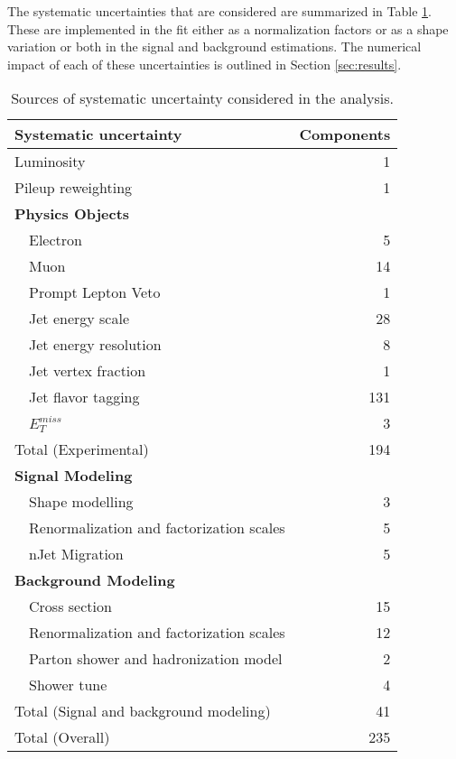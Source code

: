 
The systematic uncertainties that are considered are summarized in Table \ref{tab:SystSummary}. These are implemented in the fit either as a normalization factors or as a shape variation or both in the signal and background estimations. The numerical impact of each of these uncertainties is outlined in Section \ref{sec:results}.

\begin{table}[H]
\centering
\caption{Sources of systematic uncertainty considered in the analysis.}
\begin{tabular}{lr}
\hline\hline
Systematic uncertainty & Components  	      \\
\hline
\hline
Luminosity	& 1		      \\
Pileup reweighting 	& 1		      \\
\textbf {Physics Objects}     	&		      \\
\ \ Electron                               	& 5		      \\
\ \ Muon	& 14		      \\
\ \ Prompt Lepton Veto & 1 \\
\ \ Jet energy scale   	& 28                  \\
\ \ Jet energy resolution & 8 \\
\ \ Jet vertex fraction  	& 1		      \\
\ \ Jet flavor tagging   	& 131		      \\
\ \ $E^{miss}_T$  	& 3		      \\
\hline
Total (Experimental)        & 194		     \\
\hline
\hline
\textbf {Signal Modeling}           &                     \\
\ \ Shape modelling & 3 \\
\ \ Renormalization and factorization scales    & 5                  \\
\ \ nJet Migration & 5 \\
\textbf {Background Modeling}          	&		      \\
\ \ Cross section                 	& 15		      \\
\ \ Renormalization and factorization scales 	& 12		      \\
\ \ Parton shower and hadronization model       	& 2		      \\
\ \ Shower tune				& 4		      \\
\hline
Total (Signal and background modeling)       &  41		     \\
\hline\hline
Total (Overall)                             & 235	      \\
\hline\hline
\end{tabular}
\label{tab:SystSummary}
\end{table}

